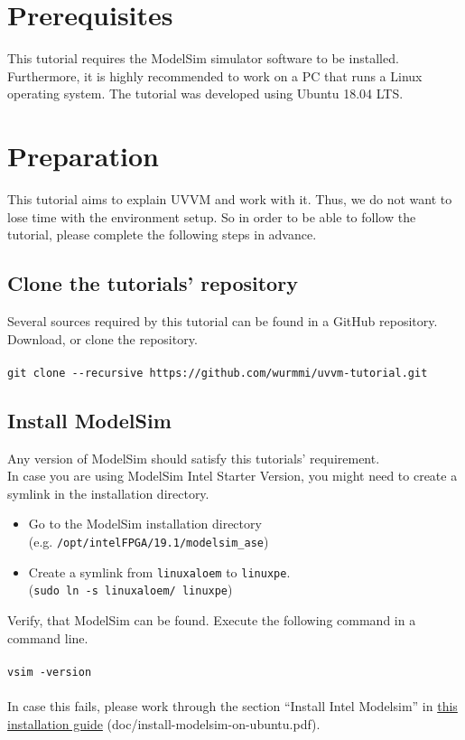 \section{Prerequisites}

This tutorial requires the ModelSim simulator software to be installed.
Furthermore, it is highly recommended to work on a PC that runs a Linux operating system. The tutorial was developed using Ubuntu 18.04 LTS.

\section{Preparation}

This tutorial aims to explain UVVM and work with it.
Thus, we do not want to lose time with the environment setup.
So in order to be able to follow the tutorial, please complete the
following steps in advance.

\subsection{Clone the tutorials' repository}

Several sources required by this tutorial can be found in a GitHub repository.\\
Download, or clone the repository.\\
\\
\texttt{git clone -{}-recursive https://github.com/wurmmi/uvvm-tutorial.git }


\subsection{Install ModelSim}

Any version of ModelSim should satisfy this tutorials' requirement.\\

In case you are using ModelSim Intel Starter Version, you might need to
create a symlink in the installation directory.
\begin{itemize}
      \item Go to the ModelSim installation directory\\
            (e.g. \texttt{/opt/intelFPGA/19.1/modelsim\_ase})
      \item Create a symlink from \texttt{linuxaloem} to \texttt{linuxpe}.\\
            (\texttt{sudo ln -s linuxaloem/ linuxpe})
\end{itemize}

Verify, that ModelSim can be found. Execute the following command in a command line.\\
\\
\texttt{vsim -version}\\
\\
In case this fails, please work through the section ``Install Intel Modelsim''
in \href{../install-modelsim-on-ubuntu.pdf}{this installation guide} (doc/install-modelsim-on-ubuntu.pdf).

\newpage
